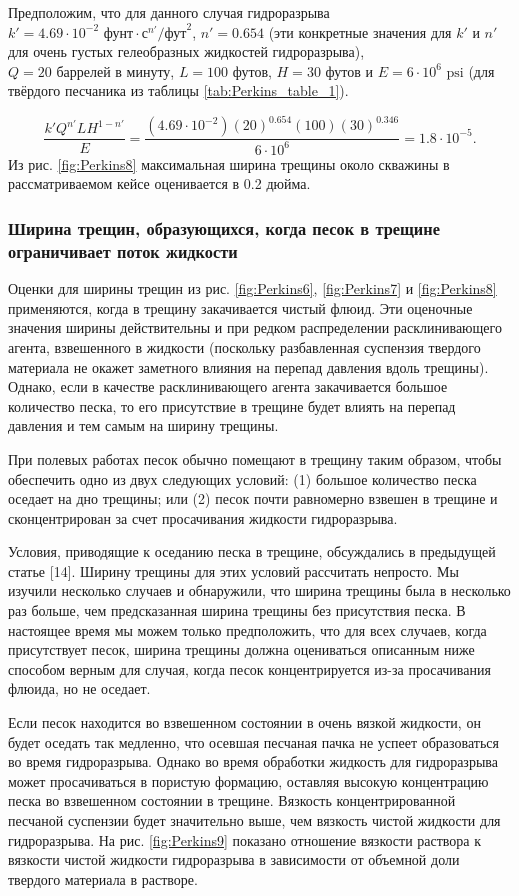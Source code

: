 \documentclass[a4paper, 12pt]{article}
\begin{document}
Предположим, что для данного случая гидроразрыва $k'=4.69\cdot 10^{-2}\text{ фунт}\cdot\text{с}^{n'}/\text{фут}^2$, $n'=0.654$ (эти конкретные значения для $k'$ и $n'$ для очень густых гелеобразных жидкостей гидроразрыва), $Q=20\text{ баррелей в минуту}$, $L=100\text{ футов}$, $H=30\text{ футов}$ и $E=6\cdot10^6\text{ psi}$ (для твёрдого песчаника из таблицы \ref{tab:Perkins_table_1}).

$$
\frac{k'Q^{n'}LH^{1-n'}}{E}=\frac{(4.69\cdot10^{-2})(20)^{0.654}(100)(30)^{0.346}}{6\cdot10^6}=1.8\cdot10^{-5}.
$$
Из рис. \ref{fig:Perkins8} максимальная ширина трещины около скважины в рассматриваемом кейсе оценивается в 0.2 дюйма.

\subsubsection{Ширина трещин, образующихся, когда песок в трещине ограничивает поток жидкости}

Оценки для ширины трещин из рис. \ref{fig:Perkins6}, \ref{fig:Perkins7} и \ref{fig:Perkins8} применяются, когда в трещину закачивается чистый флюид.
Эти оценочные значения ширины действительны и при редком распределении расклинивающего агента, взвешенного в жидкости (поскольку разбавленная суспензия твердого материала не окажет заметного влияния на перепад давления вдоль трещины).
Однако, если в качестве расклинивающего агента закачивается большое количество песка, то его присутствие в трещине будет влиять на перепад давления и тем самым на ширину трещины.

При полевых работах песок обычно помещают в трещину таким образом, чтобы обеспечить одно из двух следующих условий: (1) большое количество песка оседает на дно трещины; или (2) песок почти равномерно взвешен в трещине и сконцентрирован за счет просачивания жидкости гидроразрыва.

Условия, приводящие к оседанию песка в трещине, обсуждались в предыдущей статье [14].
Ширину трещины для этих условий рассчитать непросто.
Мы изучили несколько случаев и обнаружили, что ширина трещины была в несколько раз больше, чем предсказанная ширина трещины без присутствия песка.
В настоящее время мы можем только предположить, что для всех случаев, когда присутствует песок, ширина трещины должна оцениваться описанным ниже способом верным для случая, когда песок концентрируется из-за просачивания флюида, но не оседает.

Если песок находится во взвешенном состоянии в очень вязкой жидкости, он будет оседать так медленно, что осевшая песчаная пачка не успеет образоваться во время гидроразрыва.
Однако во время обработки жидкость для гидроразрыва может просачиваться в пористую формацию, оставляя высокую концентрацию песка во взвешенном состоянии в трещине.
Вязкость концентрированной песчаной суспензии будет значительно выше, чем вязкость чистой жидкости для гидроразрыва.
На рис. \ref{fig:Perkins9} показано отношение вязкости раствора к вязкости чистой жидкости гидроразрыва в зависимости от объемной доли твердого материала в растворе.
\end{document}
